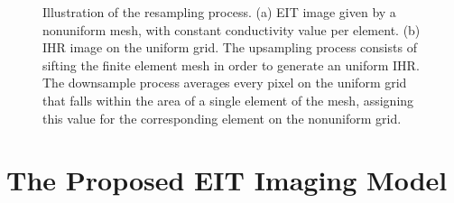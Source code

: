 \documentclass[10pt]{IEEEtran}
\begin{document}




\begin{figure}
\caption{Illustration of the resampling process. (a) EIT image given by a nonuniform mesh, with constant conductivity value per element. (b) IHR image on the uniform grid. The upsampling process consists of sifting the finite element mesh in order to generate an uniform IHR. The downsample process averages every pixel on the uniform grid that falls within the area of a single element of the mesh, assigning this value for the corresponding element on the nonuniform grid.}
\label{fig:resampling}
\end{figure}







\section{The Proposed EIT Imaging Model} \label{sec:model}
\end{document}
